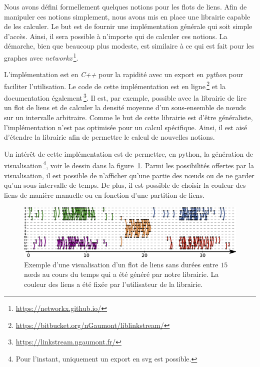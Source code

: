 Nous avons défini formellement quelques notions pour les flots de liens.
Afin de manipuler ces notions simplement, nous avons mis en place une librairie capable de les calculer.
Le but est de fournir une implémentation générale qui soit simple d'accès.
Ainsi, il sera possible à n'importe qui de calculer ces notions.
La démarche, bien que beaucoup plus modeste, est similaire à ce qui est fait pour les graphes avec \emph{networkx}\,\footnote{\url{https://networkx.github.io/}}.

L'implémentation est en \emph{C++} pour la rapidité avec un export en \emph{python} pour faciliter l'utilisation.
Le code de cette implémentation est en ligne\,\footnote{\url{https://bitbucket.org/nGaumont/liblinkstream/}} et la documentation également\,\footnote{\url{https://linkstream.ngaumont.fr/}}.
Il est, par exemple, possible avec la librairie de lire un flot de liens et de calculer la densité moyenne d'un sous-ensemble de n\oe{}uds sur un intervalle arbitraire.
Comme le but de cette librairie est d'être généraliste, l'implémentation n'est pas optimisée pour un calcul spécifique.
Ainsi, il est aisé d'étendre la librairie afin de permettre le calcul de nouvelles notions.
 

Un intérêt de cette implémentation est de permettre, en python, la génération de visualisation\,\footnote{Pour  l'instant, uniquement un export en svg est possible.}, voir le dessin dans la figure~\ref{fig:exemple_Flot_de_liens_lib}.
Parmi les possibilités offertes par la visualisation, il est possible de n'afficher qu'une partie des n\oe{}uds ou de ne garder qu'un sous intervalle de temps.
De plus, il est possible de choisir la couleur des liens de manière manuelle ou en fonction d'une partition de liens.

\begin{figure}
\centering
\includegraphics[width=\linewidth]{img/Intro/Dessin_Flot.eps}
\caption{Exemple d'une visualisation d'un flot de liens sans durées entre $15$ n\oe{}ds au cours du temps qui a été généré par notre librairie.
La couleur des liens a été fixée par l'utilisateur de la librairie.
}
\label{fig:exemple_Flot_de_liens_lib}
\end{figure}

